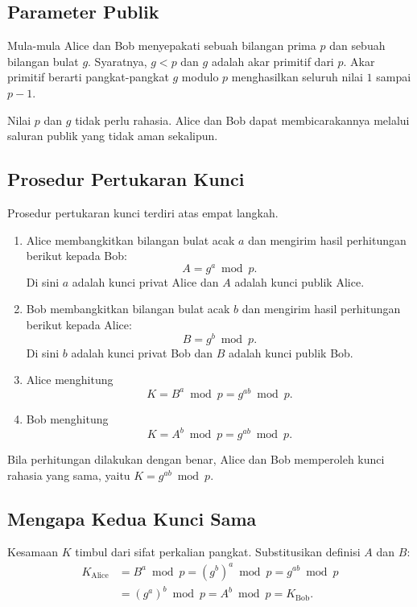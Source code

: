 \subsection{Parameter Publik}
\label{subsec:parameter-dh}

Mula-mula Alice dan Bob menyepakati sebuah bilangan prima $p$ dan sebuah
bilangan bulat $g$. Syaratnya, $g < p$ dan $g$ adalah akar primitif dari $p$.
Akar primitif berarti pangkat-pangkat $g$ modulo $p$ menghasilkan seluruh nilai
$1$ sampai $p-1$.

Nilai $p$ dan $g$ tidak perlu rahasia. Alice dan Bob dapat membicarakannya
melalui saluran publik yang tidak aman sekalipun.

\subsection{Prosedur Pertukaran Kunci}

Prosedur pertukaran kunci terdiri atas empat langkah.
\begin{enumerate}
    \item Alice membangkitkan bilangan bulat acak $a$ dan mengirim hasil
          perhitungan berikut kepada Bob:
          \[ A = g^a \bmod p . \]
          Di sini $a$ adalah kunci privat Alice dan $A$ adalah kunci publik
          Alice.
    \item Bob membangkitkan bilangan bulat acak $b$ dan mengirim hasil
          perhitungan berikut kepada Alice:
          \[ B = g^b \bmod p . \]
          Di sini $b$ adalah kunci privat Bob dan $B$ adalah kunci publik Bob.
    \item Alice menghitung
          \[ K = B^a \bmod p = g^{ab} \bmod p . \]
    \item Bob menghitung
          \[ K = A^b \bmod p = g^{ab} \bmod p . \]
\end{enumerate}

Bila perhitungan dilakukan dengan benar, Alice dan Bob memperoleh kunci rahasia
yang sama, yaitu $K = g^{ab} \bmod p$.

\subsection{Mengapa Kedua Kunci Sama}

Kesamaan $K$ timbul dari sifat perkalian pangkat. Substitusikan definisi $A$
dan $B$:
\begin{equation}
\begin{split}
K_{\text{Alice}} &= B^a \bmod p = (g^b)^a \bmod p = g^{ab} \bmod p \\
                 &= (g^a)^b \bmod p = A^b \bmod p = K_{\text{Bob}} .
\end{split}
\label{eq:dh-bukti}
\end{equation}

